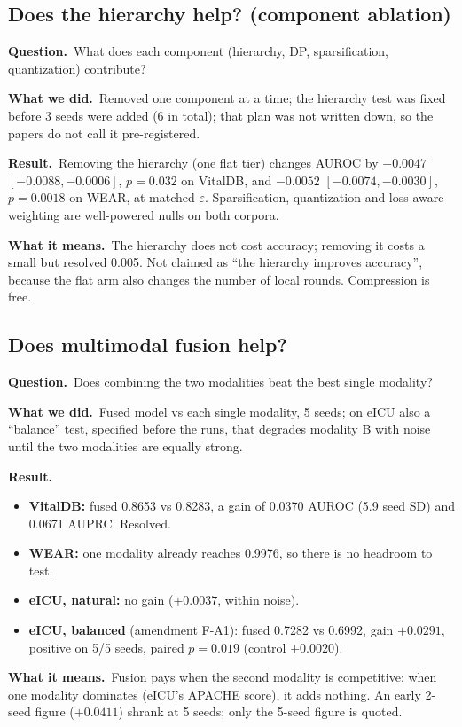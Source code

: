 \documentclass[11pt,a4paper]{article}
\newenvironment{experiment}[2]{\subsection{#1}\label{#2}}{}
\newcommand{\Q}{\par\textbf{Question.}\ }
\newcommand{\D}{\par\textbf{What we did.}\ }
\newcommand{\R}{\par\textbf{Result.}\ }
\newcommand{\M}{\par\textbf{What it means.}\ }
\begin{document}
\begin{experiment}{Does the hierarchy help? (component ablation)}{exp:abl}
\Q What does each component (hierarchy, DP, sparsification, quantization)
contribute?
\D Removed one component at a time; the hierarchy test was fixed before 3
seeds were added (6 in total); that plan was not written down, so the papers
do not call it pre-registered.
\R Removing the hierarchy (one flat tier) changes AUROC by $-0.0047$
$[-0.0088, -0.0006]$, $p = 0.032$ on VitalDB, and $-0.0052$ $[-0.0074,
-0.0030]$, $p = 0.0018$ on WEAR, at matched $\varepsilon$. Sparsification,
quantization and loss-aware weighting are well-powered nulls on both corpora.
\M The hierarchy does not cost accuracy; removing it costs a small but
resolved 0.005. Not claimed as ``the hierarchy improves accuracy'', because the
flat arm also changes the number of local rounds. Compression is free.
\end{experiment}

\begin{experiment}{Does multimodal fusion help?}{exp:fusion}
\Q Does combining the two modalities beat the best single modality?
\D Fused model vs each single modality, 5 seeds; on eICU also a
``balance'' test, specified before the runs, that degrades modality B with noise until the two modalities
are equally strong.
\R
\begin{itemize}
\item \textbf{VitalDB:} fused 0.8653 vs 0.8283, a gain of 0.0370 AUROC (5.9 seed
SD) and 0.0671 AUPRC. Resolved.
\item \textbf{WEAR:} one modality already reaches 0.9976, so there is no
headroom to test.
\item \textbf{eICU, natural:} no gain ($+0.0037$, within noise).
\item \textbf{eICU, balanced} (amendment F-A1): fused 0.7282 vs 0.6992, gain
$+0.0291$, positive on 5/5 seeds, paired $p = 0.019$ (control $+0.0020$).
\end{itemize}
\M Fusion pays when the second modality is competitive; when one modality
dominates (eICU's APACHE score), it adds nothing. An early 2-seed figure
($+0.0411$) shrank at 5 seeds; only the 5-seed figure is quoted.
\end{experiment}
\end{document}

